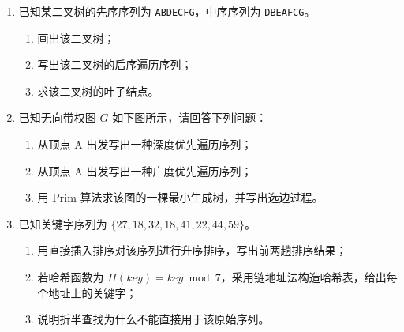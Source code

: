 \documentclass{../../note}
\begin{document}
\begin{enumerate}[itemsep=1.2em]
\item 已知某二叉树的先序序列为 \texttt{ABDECFG}，中序序列为 \texttt{DBEAFCG}。
\begin{enumerate}[label=(\arabic*)]
\item 画出该二叉树；
\item 写出该二叉树的后序遍历序列；
\item 求该二叉树的叶子结点。
\end{enumerate}

\item 已知无向带权图 $G$ 如下图所示，请回答下列问题：
\begin{enumerate}[label=(\arabic*)]
\item 从顶点 A 出发写出一种深度优先遍历序列；
\item 从顶点 A 出发写出一种广度优先遍历序列；
\item 用 Prim 算法求该图的一棵最小生成树，并写出选边过程。
\end{enumerate}

\begin{center}
\end{center}

\item 已知关键字序列为 $\{27,18,32,18,41,22,44,59\}$。
\begin{enumerate}[label=(\arabic*)]
\item 用直接插入排序对该序列进行升序排序，写出前两趟排序结果；
\item 若哈希函数为 $H(key)=key\bmod 7$，采用链地址法构造哈希表，给出每个地址上的关键字；
\item 说明折半查找为什么不能直接用于该原始序列。
\end{enumerate}
\end{enumerate}
\end{document}
